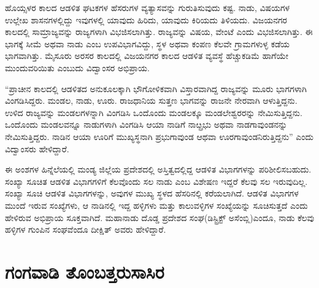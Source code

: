 ಹೊಯ್ಸಳರ ಕಾಲದ ಆಡಳಿತ ಘಟಕಗಳ ಹೆಸರುಗಳ ವ್ಯತ್ಯಾಸವನ್ನು ಗುರುತಿಸುವುದು ಕಷ್ಟ. ನಾಡು, ವಿಷಯಗಳ ಉಲ್ಲೇಖ ಶಾಸನಗಳಲ್ಲಿದ್ದು ಇವುಗಳಲ್ಲಿ ಯಾವುದು ಹಿರಿದು, ಯಾವುದು ಕಿರಿಯದು ತಿಳಿಯದು. ವಿಜಯನಗರ ಕಾಲದಲ್ಲಿ ಸಾಮ್ರಾಜ್ಯವನ್ನು ರಾಜ್ಯಗಳಾಗಿ ವಿಭಜಿಸಲಾಗಿತ್ತು. ರಾಜ್ಯವನ್ನು ವಿಷಯ, ವೇಂಟೆ ಎಂದು ವಿಭಜಿಸಲಾಗಿತ್ತು. ಈ ಭಾಗಕ್ಕೆ ಸೀಮೆ ಅಥವಾ ನಾಡು ಎಂಬ ಉಪವಿಭಾಗವಿದ್ದು, ಸ್ಥಳ ಅಥವಾ ಕಂಪಣ ಕೆಲವೇ ಗ್ರಾಮಗಳುಳ್ಳ ಕಡೆಯ ಭಾಗವಾಗಿತ್ತು. ಮೈಸೂರು ಅರಸರ ಕಾಲದಲ್ಲಿ ವಿಜಯನಗರ ಕಾಲದ ಆಡಳಿತ ವ್ಯವಸ್ಥೆ ಹೆಚ್ಚುಕಡಿಮೆ ಹಾಗೆಯೇ ಮುಂದುವರಿಯಿತು ಎಂಬುದು ವಿದ್ವಾಂಸರ ಅಭಿಪ್ರಾಯ.

“ಪ್ರಾಚೀನ ಕಾಲದಲ್ಲಿ ಆಡಳಿತದ ಅನುಕೂಲಕ್ಕಾಗಿ ಭೌಗೋಳಿಕವಾಗಿ ವಿಸ್ತಾರವಾಗಿದ್ದ ರಾಜ್ಯವನ್ನು ಮೂರು ಭಾಗಗಳಾಗಿ ವಿಂಗಡಿಸಿದ್ದರು. ಮಂಡಲ, ನಾಡು, ಊರು. ರಾಜಧಾನಿಯ ಸುತ್ತಣ ಭಾಗವನ್ನು ರಾಜನೇ ನೇರವಾಗಿ ಆಳುತ್ತಿದ್ದನು. ಉಳಿದ ರಾಜ್ಯವನ್ನು ಮಂಡಲಗಳನ್ನಾಗಿ ವಿಂಗಡಿಸಿ ಒಂದೊಂದು ಮಂಡಲಕ್ಕೂ ಮಂಡಲೇಶ್ವರರನ್ನು ನೇಮಿಸು\-ತ್ತಿದ್ದನು. ಒಂದೊಂದು ಮಂಡಲವನ್ನೂ ನಾಡುಗಳಾಗಿ ವಿಂಗಡಿಸಿ ಆಯಾ ನಾಡಿಗೆ ನಾೞ್ಪ್ರಭು ಅಥವಾ ನಾಡಗಾವುಂಡನನ್ನು ನೇಮಿಸು\-ತ್ತಿದ್ದರು. ನಾಡಿನ ಆಯಾ ಊರಿಗೆ ಮುಖ್ಯಸ್ಥನಾಗಿ ಪ್ರಭುಗಾವುಂಡ ಆಥವಾ ಊರಗಾವುಂಡನಿರುತ್ತಿದ್ದನು” ಎಂದು ವಿದ್ವಾಂಸರು ಹೇಳಿದ್ದಾರೆ.

ಈ ಅಂಶಗಳ ಹಿನ್ನೆಲೆಯಲ್ಲಿ ಮಂಡ್ಯ ಜಿಲ್ಲೆಯ ಪ್ರದೇಶದಲ್ಲಿ ಅಸ್ತಿತ್ವದಲ್ಲಿದ್ದ ಆಡಳಿತ ವಿಭಾಗಗಳನ್ನು ಪರಿಶೀಲಿಸ\-ಬಹುದು. ಸಂಖ್ಯಾ ಸೂಚಿತ ಆಡಳಿತ ವಿಭಾಗಗಳಿಗೆ ಕೆಲವೊಂದು ಸಲ ನಾಡು ಎಂಬ ವಿಶೇಷಣ ಇದ್ದರೆ ಕೆಲವು ಸಲ ಇರುವುದಿಲ್ಲ. ಸಂಖ್ಯಾ ಸೂಚಿ ಆಡಳಿತ ವಿಭಾಗಗಳನ್ನು, ಅವುಗಳ ಮುಖ್ಯ ಸ್ಥಳದ ಹೆಸರಿನಲ್ಲಿ ಕರೆಯಲಾಗಿದೆ. ಆಡಳಿತ ವಿಭಾಗಗಳ ಮುಂದೆ ಇರುವ ಸಂಖ್ಯೆಗಳು, ಆ ನಾಡಿನಲ್ಲಿ ಇದ್ದ ಹಳ್ಳಿಗಳು ಮತ್ತು ಕಾಲುವಳ್ಳಿಗಳ ಸಂಖ್ಯೆಯನ್ನು ಸೂಚಿಸುತ್ತದೆ ಎಂದು ಹೇಳಿರುವ ಅಭಿಪ್ರಾಯ ಸೂಕ್ತವಾಗಿದೆ. ಮಹಾನಾಡು ದೊಡ್ಡ ಪ್ರದೇಶದ ಸಂಘ(ಡಿಸ್ಟ್ರಿಕ್ಟ್​ ಅಸೆಂಬ್ಲಿ)ಎಂದೂ, ನಾಡು ಕೆಲವು ಹಳ್ಳಿಗಳ ಗುಂಪಿನ ಸಂಘವೆಂದೂ ದೀಕ್ಷಿತ್​ ಅವರು ಹೇಳಿದ್ದಾರೆ.

\section{ಗಂಗವಾಡಿ ತೊಂಬತ್ತರುಸಾಸಿರ}

